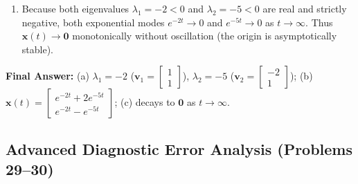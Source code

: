 \documentclass[11pt, letterpaper]{article}
\theoremstyle{definition}
\theoremstyle{remark}
\begin{document}
\begin{enumerate}[label=(\alph*)]
    \item Because both eigenvalues $\lambda_1 = -2 < 0$ and $\lambda_2 = -5 < 0$ are real and strictly negative, both exponential modes $e^{-2t} \to 0$ and $e^{-5t} \to 0$ as $t \to \infty$. Thus $\mathbf{x}(t) \to \mathbf{0}$ monotonically without oscillation (the origin is asymptotically stable).
\end{enumerate}
\textbf{Final Answer:} (a) $\lambda_1 = -2$ ($\mathbf{v}_1 = \begin{bmatrix} 1 \\ 1 \end{bmatrix}$), $\lambda_2 = -5$ ($\mathbf{v}_2 = \begin{bmatrix} -2 \\ 1 \end{bmatrix}$); (b) $\mathbf{x}(t) = \begin{bmatrix} e^{-2t} + 2e^{-5t} \\ e^{-2t} - e^{-5t} \end{bmatrix}$; (c) decays to $\mathbf{0}$ as $t \to \infty$.

\subsection{Advanced Diagnostic Error Analysis (Problems 29--30)}
\end{document}
